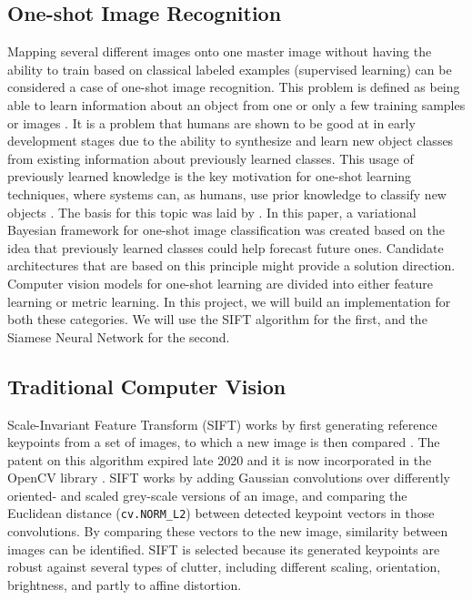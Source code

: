 \documentclass[sigconf, natbib=false, nonacm]{acmart}
\begin{document}
    \subsection{One-shot Image Recognition}
        Mapping several different images onto one master image without having the ability to train based on classical labeled examples (supervised learning) can be considered a case of one-shot image recognition. This problem is defined as being able to learn information about an object from one or only a few training samples or images \cite{WikipediaOneShotLearning2021}. It is a problem that humans are shown to be good at in early development stages due to the ability to synthesize and learn new object classes from existing information about previously learned classes. This usage of previously learned knowledge is the key motivation for one-shot learning techniques, where systems can, as humans, use prior knowledge to classify new objects \cite{Fei-Fei2003, Fei-Fei2006}. The basis for this topic was laid by  \citeauthor{Fei-Fei2003} \cite{Fei-Fei2003}. In this paper, a variational Bayesian framework for one-shot image classification was created based on the idea that previously learned classes could help forecast future ones. Candidate architectures that are based on this principle might provide a solution direction. Computer vision models for one-shot learning are divided into either feature learning or metric learning. In this project, we will build an implementation for both these categories. We will use the SIFT algorithm for the first, and the Siamese Neural Network for the second. 
        
    \subsection{Traditional Computer Vision}
        \label{sec:traditionalcomputervision}
        Scale-Invariant Feature Transform (SIFT) works by first generating reference keypoints from a set of images, to which a new image is then compared  \cite{Low2004, Wan2013}. The patent on this algorithm expired late 2020 and it is now incorporated in the OpenCV library \cite{OpenCV2020}. SIFT works by adding Gaussian convolutions over differently oriented- and scaled grey-scale versions of an image, and comparing the Euclidean distance (\lstinline{cv.NORM_L2}) between detected keypoint vectors in those convolutions. By comparing these vectors to the new image, similarity between images can be identified. SIFT is selected because its generated keypoints are robust against several types of clutter, including different scaling, orientation, brightness, and partly to affine distortion. 
        
\end{document}

